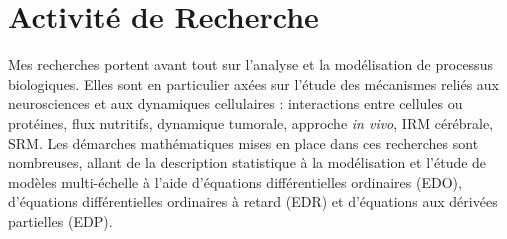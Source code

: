 \documentclass[a4paper, 12pt, twoside, openright]{article}
\begin{document}
\section{Activité de Recherche}\label{AR}
Mes recherches portent avant tout sur l'analyse et la modélisation de processus biologiques. Elles sont en particulier axées sur l'étude des mécanismes reliés aux neurosciences et aux dynamiques cellulaires : interactions entre cellules ou protéines, flux nutritifs, dynamique tumorale, approche \textit{in vivo}, IRM cérébrale, SRM. Les démarches mathématiques mises en place dans ces recherches sont nombreuses, allant de la description statistique à la modélisation et l'étude de modèles multi-échelle à l'aide d'équations différentielles ordinaires (EDO), d'équations différentielles ordinaires à retard (EDR) et d'équations aux dérivées partielles (EDP).
\end{document}
